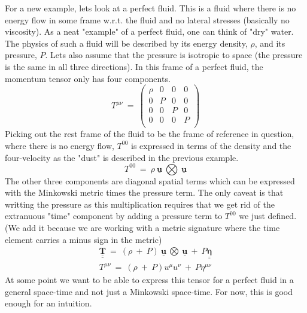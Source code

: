 \hskip 25pt For a new example, lets look at a perfect fluid.  This is a fluid where there is no energy flow in
some frame w.r.t. the fluid and no lateral stresses (basically no viscosity).  As a neat "example" of a perfect fluid, one
can think of "dry" water.  The physics of such a fluid will be described by its energy density, $\rho$, and its
pressure, $P$.  Lets also assume that the pressure is isotropic to space (the pressure is the same in all three directions).
In this frame of a perfect fluid, the momentum tensor only has four components.
\begin{equation}
  T^{\mu\nu}\ =\ 
  \begin{pmatrix}
    \rho & 0 & 0 & 0 \\
    0 & P & 0 & 0 \\
    0 & 0 & P & 0 \\
    0 & 0 & 0 & P \\
  \end{pmatrix}
\end{equation}
Picking out the rest frame of the fluid to be the frame of reference in question, where there is no energy flow,
$T^{00}$ is expressed in terms of the density and the four-velocity as the "dust" is described in the previous example.
\begin{equation}
  T^{00}\ =\ \rho\ \underline{\mathbf{u}}\ \bigotimes\ \underline{\mathbf{u}}
\end{equation}
The other three components are diagonal spatial terms which can be expressed with the Minkowski metric times the pressure
term.  The only caveat is that writting the pressure as this multiplication requires that we get rid of the extranuous
"time" component by adding a pressure term to $T^{00}$ we just defined.  (We add it because we are working with a metric
signature where the time element carries a minus sign in the metric)
\begin{gather}
  \underline{\underline{\mathbf{T}}}\ =\
  \left(\rho\ +\ P\right)\
  \underline{\mathbf{u}}\ \bigotimes\ \underline{\mathbf{u}}\ +\ P\underline{\underline{\mathbf{\eta}}} \\
  T^{\mu\nu}\ =\ \left(\rho\ +\ P\right)u^{\mu}u^{\nu}\ +\ P\eta^{\mu\nu}
\end{gather}
At some point we want to be able to express this tensor for a perfect fluid in a general space-time and not just a
Minkowski space-time.  For now, this is good enough for an intuition.


